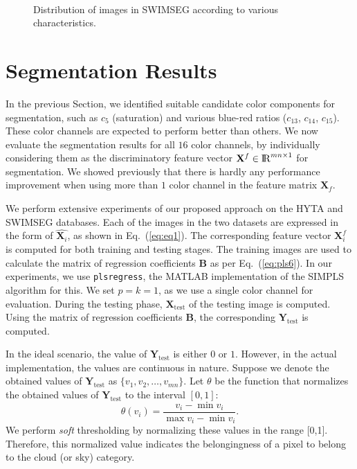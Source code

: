 \begin{figure}[htbp]
\centering
{}
\\
\vspace{-0.1in}
\caption{Distribution of images in SWIMSEG according to various characteristics.}\label{fig:image-stats}
\end{figure}



\section{Segmentation Results}
\label{sec:result-segment}
In the previous Section, we identified suitable candidate color components for segmentation, such as $c_{5}$ (saturation) and various blue-red ratios ($c_{13}$, $c_{14}$, $c_{15}$). These color channels are expected to perform better than others. We now evaluate the segmentation results for all $16$ color channels, by individually considering them as the discriminatory feature vector $\mathbf{X}^{f} \in {\rm I\!R}^{mn \times 1}$ for segmentation. We showed previously \cite{ICIP1_2014} that there is hardly any performance improvement when using more than $1$ color channel in the feature matrix $\mathbf{X}_f$.

We perform extensive experiments of our proposed approach on the HYTA and SWIMSEG databases. Each of the images in the two datasets are expressed in the form of $\hat{\mathbf{X}_{i}}$, as shown in Eq.\ (\ref{eq:eq1}). The corresponding feature vector $\mathbf{X}_i^{f}$ is computed for both training and testing stages.  The training images are used to calculate the matrix of regression coefficients $\mathbf{B}$ as per Eq.\ (\ref{eq:pls6}). In our experiments, we use \texttt{plsregress}, the MATLAB implementation of the SIMPLS algorithm \cite{SIMPLS} for this. 
We set $p=k=1$, as we use a single color channel for evaluation.
During the testing phase, $\mathbf{X}_{\mathrm{test}}$ of the testing image is computed. Using the matrix of regression coefficients $\mathbf{B}$, the corresponding $\mathbf{Y}_{\mathrm{test}}$ is computed. 

In the ideal scenario, the value of $\mathbf{Y}_{\mathrm{test}}$ is either $0$ or $1$. However, in the actual implementation, the values are continuous in nature. Suppose we denote the obtained values of $\mathbf{Y}_{\mathrm{test}}$ as $\{v_1, v_2, \ldots, v_{mn} \}$. Let $\theta$ be the function that normalizes the obtained values of $\mathbf{Y}_{\mathrm{test}}$ to the interval $[0,1]$:
$$\theta(v_i)=\frac{v_i - \min v_i}{\max v_i-\min v_i}.$$ 
We perform \emph{soft} thresholding by normalizing these values in the range [0,1]. Therefore, this normalized value indicates the belongingness of a pixel to belong to the cloud (or sky) category. 

